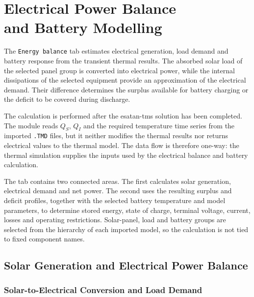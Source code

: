 \chapter[Electrical Power Balance and Battery Modelling]
{Electrical Power Balance\\and Battery Modelling}
\label{ch:electrical_battery_analysis}

The \texttt{Energy balance} tab estimates electrical generation, load demand
and battery response from the transient thermal results. The absorbed solar
load of the selected panel group is converted into electrical power, while the
internal dissipations of the selected equipment provide an approximation of
the electrical demand. Their difference determines the surplus available for
battery charging or the deficit to be covered during discharge.

The calculation is performed after the \acrshort{esatan-tms} solution has
been completed. The module reads $Q_S$, $Q_I$ and the required temperature
time series from the imported \texttt{.TMD} files, but it neither modifies the
thermal results nor returns electrical values to the thermal model. The data
flow is therefore one-way: the thermal simulation supplies the inputs used by
the electrical balance and battery calculation.

The tab contains two connected areas. The first calculates solar generation,
electrical demand and net power. The second uses the resulting surplus and
deficit profiles, together with the selected battery temperature and model
parameters, to determine stored energy, state of charge, terminal voltage,
current, losses and operating restrictions. Solar-panel, load and battery
groups are selected from the hierarchy of each imported model, so the
calculation is not tied to fixed component names.


\section{Solar Generation and Electrical Power Balance}
\label{sec:solar_electrical_balance}

\subsection{Solar-to-Electrical Conversion and Load Demand}
\label{subsec:solar_conversion_load_demand}

